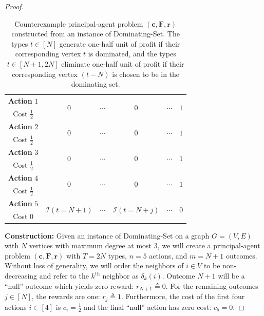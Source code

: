 \documentclass{article}
\newcommand{\indicator}[1]{\mathcal{I}\left(#1\right)}
\newcommand{\DSet}{\textnormal{Dominating-Set}\xspace}
\newcommand{\costvector}{\bm{c}}
\newcommand{\Cost}[1]{c_{#1}}
\newcommand{\ForecastTensor}{\bm{F}}
\newcommand{\rewardvector}{\bm{r}}
\newcommand{\Reward}[1]{r_{#1}}
\newcommand{\PrincipalAgentProblem}{\left(\costvector, \ForecastTensor, \rewardvector\right)}
\newcommand{\neighbor}[2]{\delta_{#1}\left(#2\right)}%
\begin{document}
\begin{proof}
\begin{table}
\begin{tabular}{cccccc}
  \textbf{Action} $1$ & \multirow{2}{*}{$0$} & \multirow{2}{*}{$\cdots$} & \multirow{2}{*}{$0$} & \multirow{2}{*}{$\cdots$} & \multirow{2}{*}{$1$} \\ Cost $\tfrac12$ \\
  \textbf{Action} $2$ & \multirow{2}{*}{$0$} & \multirow{2}{*}{$\cdots$} & \multirow{2}{*}{$0$} & \multirow{2}{*}{$\cdots$} & \multirow{2}{*}{$1$} \\ Cost $\tfrac12$ \\
  \textbf{Action} $3$ & \multirow{2}{*}{$0$} & \multirow{2}{*}{$\cdots$} & \multirow{2}{*}{$0$} & \multirow{2}{*}{$\cdots$} & \multirow{2}{*}{$1$} \\ Cost $\tfrac12$ \\
  \textbf{Action} $4$ & \multirow{2}{*}{$0$} & \multirow{2}{*}{$\cdots$} & \multirow{2}{*}{$0$} & \multirow{2}{*}{$\cdots$} & \multirow{2}{*}{$1$} \\ Cost $\tfrac12$ \\
  \textbf{Action} $5$ & \multirow{2}{*}{$\indicator{t = N + 1}$} & \multirow{2}{*}{$\cdots$} & \multirow{2}{*}{$\indicator{t = N + j}$} & \multirow{2}{*}{$\cdots$} & \multirow{2}{*}{$0$} \\ Cost $0$ \\ \midrule
  \bottomrule
\end{tabular}
\caption{Counterexample principal-agent problem $\PrincipalAgentProblem$ constructed from an instance of \DSet{}. The types $t \in [N]$ generate one-half unit of profit if their corresponding vertex $t$ is dominated, and the types $t \in [N+1, 2N]$ eliminate one-half unit of profit if their corresponding vertex $(t - N)$ is chosen to be in the dominating set.}
\label{tab:apx-hard}
\end{table}%

\textbf{Construction:} Given an instance of \DSet on a graph $G = (V,E)$ with $N$ vertices with maximum degree at most $3$, we will create a principal-agent problem $\PrincipalAgentProblem$ with $T = 2N$ types, $n = 5$ actions, and $m = N + 1$ outcomes. Without loss of generality, we will order the neighbors of $i \in V$ to be non-decreasing and refer to the $k^{\text{th}}$ neighbor as $\neighbor{k}{i}$. Outcome $N + 1$ will be a ``null'' outcome which yields zero reward: $\Reward{N+1} \triangleq 0$. For the remaining outcomes $j \in [N]$, the rewards are one: $\Reward{j} \triangleq 1$. Furthermore, the cost of the first four actions $i \in [4]$ is $\Cost{i} = \tfrac12$ and the final ``null'' action has zero cost: $\Cost{5} = 0$.


\end{proof}
\end{document}
